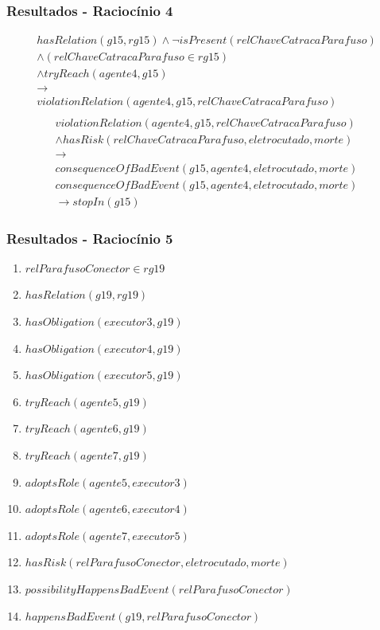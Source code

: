 \documentclass{beamer}
\begin{document}
\begin{frame}
	\frametitle{Resultados - Raciocínio 4}
	\begin{eqnarray}
		hasRelation(g15,rg15) \wedge \neg isPresent(relChaveCatracaParafuso)  \nonumber \\ 
		\wedge (relChaveCatracaParafuso \in rg15) \nonumber \\
		\wedge tryReach(agente4,g15) \nonumber \\ 
		\to \nonumber \\ 
		violationRelation(agente4,g15,relChaveCatracaParafuso) \nonumber \\
	\end{eqnarray}
	\begin{eqnarray}\nonumber
		violationRelation(agente4,g15,relChaveCatracaParafuso) \nonumber \\ 
		 \wedge hasRisk(relChaveCatracaParafuso,eletrocutado,morte) \nonumber \\ 
		\to \nonumber \\ 
		consequenceOfBadEvent(g15,agente4,eletrocutado,morte)
	\end{eqnarray}
	\begin{eqnarray}
		consequenceOfBadEvent(g15,agente4,eletrocutado,morte) \nonumber \\ 
		\to stopIn(g15)
	\end{eqnarray}
\end{frame}

\begin{frame}
	\frametitle{Resultados - Raciocínio 5}
	\begin{enumerate}
		\item $relParafusoConector \in rg19$	
		\item $hasRelation(g19,rg19)$		
		\item $hasObligation(executor3,g19)$
		\item $hasObligation(executor4,g19)$
		\item $hasObligation(executor5,g19)$		
		\item $tryReach(agente5,g19)$
		\item $tryReach(agente6,g19)$
		\item $tryReach(agente7,g19)$									
		\item $adoptsRole(agente5,executor3)$
		\item $adoptsRole(agente6,executor4)$
		\item $adoptsRole(agente7,executor5)$
		\item $hasRisk(relParafusoConector,eletrocutado,morte)$
		\item $possibilityHappensBadEvent(relParafusoConector)$
		\item $happensBadEvent(g19,relParafusoConector)$	
	\end{enumerate}
\end{frame}
\end{document}
